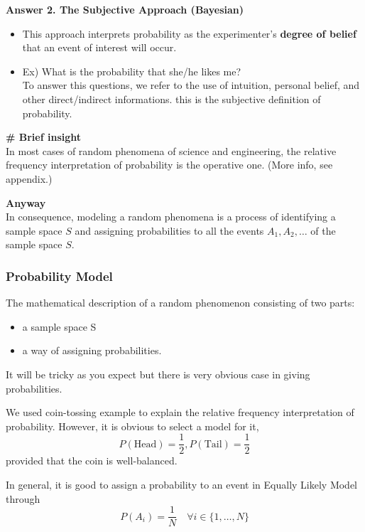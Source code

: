 \documentclass[twoside]{article}
\theoremstyle{definition}
\theoremstyle{remark}
\begin{document}
\textbf{Answer 2. The Subjective Approach (Bayesian)}
\begin{itemize}
  \item This approach interprets probability as the experimenter's
    \textbf{degree of belief} that an event of interest will occur.

  \item Ex) What is the probability that she/he likes me? \\
    To answer this questions, we refer to the use of intuition,
    personal belief, and other direct/indirect informations.
    this is the subjective definition of probability.
\end{itemize}

\textbf{\# Brief insight} \\
In most cases of random phenomena of science and engineering, the relative
frequency interpretation of probability is the operative one. (More info, see appendix.)

\textbf{Anyway} \\
In consequence, modeling a random phenomena is a process of identifying a
sample space $S$ and assigning probabilities to all the events $A_1,A_2,\ldots$
of the sample space $S$.

\clearpage

\subsubsection{Probability Model}
The mathematical description of a random phenomenon consisting of two parts:
\begin{itemize}
  \item a sample space S
  \item a way of assigning probabilities.
\end{itemize}

It will be tricky as you expect but there is very obvious case in giving
probabilities.

We used coin-tossing example to explain the relative frequency interpretation
of probability. However, it is obvious to select a model for it,
\begin{equation}
  P(\textrm{Head}) = \frac{1}{2}, P(\textrm{Tail}) = \frac{1}{2}
\end{equation}
provided that the coin is well-balanced.

In general, it is good to assign a probability to an event in Equally Likely Model
through
\begin{equation}
  P(A_i) = \frac{1}{N} \quad \forall i \in \{1,\ldots,N\}
\end{equation}
\end{document}
